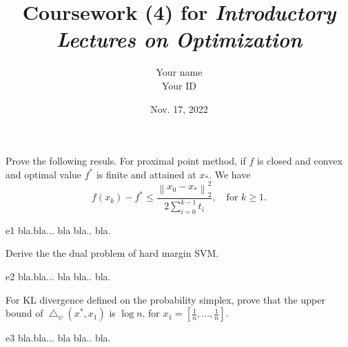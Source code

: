 \documentclass{article}
\title{Coursework (4) for \emph{Introductory Lectures on Optimization}}
\author{Your name \\ Your ID}
\date{Nov. 17, 2022}
\newcommand{\normtwo}[1]{\left\| #1 \right\|_2}
\begin{document}
\maketitle

\begin{excercise}\label{e1}
Prove the following resuls.
For proximal point method, if $f$ is closed and convex and optimal value $f^*$ is finite and attained at $x_*$. We have
\[
f(x_k) - f^* \leq \frac{ \normtwo{x_0 - x_*}^2 }{ 2 \sum_{i=0}^{k-1} t_i}, \quad\textrm{for } k \geq 1.
\]
\end{excercise}

\begin{PROOF}{e1}
bla.bla... bla bla.. bla.
\end{PROOF}

\begin{excercise}\label{e2}
Derive the the dual problem of hard margin SVM.
\end{excercise}

\begin{SOLUTION}{e2}
	bla.bla... bla bla.. bla.
\end{SOLUTION}

\begin{excercise}\label{e3}
For KL divergence defined on the probability simplex,  prove that the upper bound of 
$\bigtriangleup_{\psi} (x^*, x_{1}) $ is $\log n$, for $x_1 = [\frac{1}{n}, \ldots, \frac{1}{n}]$.
\end{excercise}

\begin{PROOF}{e3}
bla.bla... bla bla.. bla.
\end{PROOF}
\end{document}
